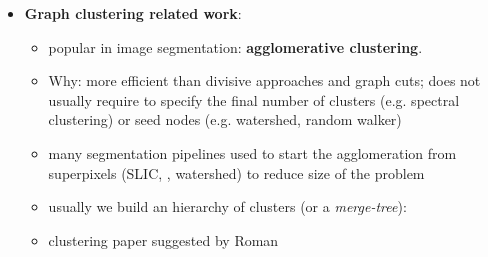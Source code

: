 \begin{itemize}
\item \textbf{Graph clustering related work}:
\begin{itemize}
    \item popular in image segmentation: \textbf{agglomerative clustering}.
    \item Why: more efficient than divisive approaches and graph cuts; does not usually require to specify the final number of clusters (e.g. spectral clustering) or seed nodes (e.g. watershed, random walker) 
    \item many segmentation pipelines used to start the agglomeration from superpixels (SLIC, \cite{felzenszwalb2004efficient}, watershed) to reduce size of the problem 
    \item usually we build an hierarchy of clusters (or a \emph{merge-tree}): 
    \item clustering paper suggested by Roman

 
\begin{itemize}


\end{itemize}
\end{itemize}
\end{itemize}
